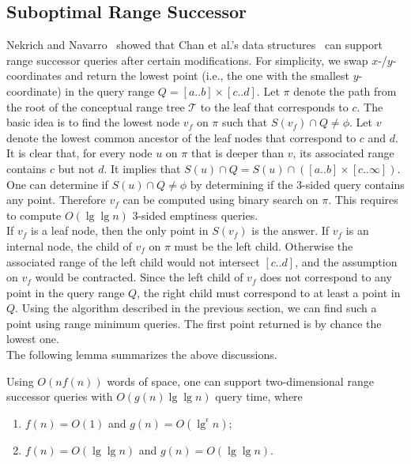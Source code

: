 \documentclass{llncs}
\begin{document}
\subsection{Suboptimal Range Successor}

\indent Nekrich and Navarro~\cite{DBLP:conf/swat/NekrichN12} showed that
Chan et al.'s data structures~\cite{DBLP:conf/compgeom/ChanLP11} can support range successor queries after certain modifications.
For simplicity, we swap $x$-/$y$-coordinates and return the lowest point (i.e., the one with the smallest $y$-coordinate)
in the query range $Q = [a..b]\times[c..d]$.
Let $\pi$ denote the path from the root of the conceptual range tree $\mathcal T$ to the leaf that corresponds to $c$.
The basic idea is to find the lowest node $v_f$ on $\pi$ such that $S(v_f) \cap Q \neq \phi$.
Let $v$ denote the lowest common ancestor of the leaf nodes that correspond to $c$ and $d$.
It is clear that, for every node $u$ on $\pi$ that is deeper than $v$, its associated range contains $c$ but not $d$.
It implies that $S(u) \cap Q = S(u) \cap ([a..b]\times[c..\infty])$.
One can determine if $S(u) \cap Q \neq \phi$ by determining if the 3-sided query contains any point.
Therefore $v_f$ can be computed using binary search on $\pi$.
This requires to compute $O(\lg\lg n)$ 3-sided emptiness queries. \\
\indent If $v_f$ is a leaf node, then the only point in $S(v_f)$ is the answer.
If $v_f$ is an internal node, the child of $v_f$ on $\pi$ must be the left child.
Otherwise the associated range of the left child would not intersect $[c..d]$,
and the assumption on $v_f$ would be contracted.
Since the left child of $v_f$ does not correspond to any point in the query range $Q$,
the right child must correspond to at least a point in $Q$.
Using the algorithm described in the previous section, we can find such a point using range minimum queries.
The first point returned is by chance the lowest one. \\
\indent The following lemma summarizes the above discussions.
\begin{lemma}
    Using $O(nf(n))$ words of space,
    one can support two-dimensional range successor queries with $O(g(n)\lg\lg n)$ query time,
    where
    \begin{enumerate}
        \item $f(n) = O(1)$ and $g(n) = O(\lg^\epsilon n)$;
        \item $f(n) = O(\lg\lg n)$ and $g(n) = O(\lg\lg n)$.
    \end{enumerate}
\end{lemma}
\end{document}
